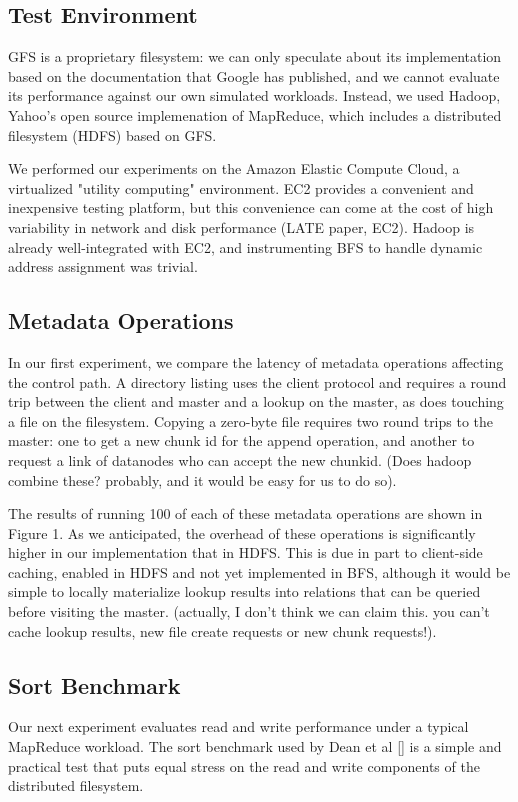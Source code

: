 \documentclass{article}
\begin{document}
\subsection{Test Environment}
GFS is a proprietary filesystem: we can only speculate about its implementation based on the documentation that Google has published, and we cannot evaluate its performance against our own simulated workloads.  Instead, we used Hadoop, Yahoo's open source implemenation of MapReduce, which includes a distributed filesystem (HDFS) based on GFS.

We performed our experiments on the Amazon Elastic Compute Cloud, a virtualized "utility computing" environment.  EC2 provides a convenient and inexpensive testing platform, but this convenience can come at the cost of high variability in network and disk performance (LATE paper, EC2).  Hadoop is already well-integrated with EC2, and instrumenting BFS to handle dynamic address assignment was trivial.

\subsection{Metadata Operations}
In our first experiment, we compare the latency of metadata operations affecting the control path.  A directory listing uses the client protocol and requires a round trip between the client and master and a lookup on the master, as does touching a file on the filesystem.  Copying a zero-byte file requires two round trips to the master: one to get a new chunk id for the append operation, and another to request a link of datanodes who can accept the new chunkid.  (Does hadoop combine these?  probably, and it would be easy for us to do so).

The results of running 100 of each of these metadata operations are shown in Figure 1.  As we anticipated, the overhead of these operations is significantly higher in our implementation that in HDFS.  This is due in part to client-side caching, enabled in HDFS and not yet implemented in BFS, although it would be simple to locally materialize lookup results into relations that can be queried before visiting the master. (actually, I don't think we can claim this.  you can't cache lookup results, new file create requests or new chunk requests!).

\subsection{Sort Benchmark}
Our next experiment evaluates read and write performance under a typical MapReduce workload.  The sort benchmark used by Dean et al [] is a simple and practical test that puts equal stress on the read and write components of the distributed filesystem.  
\end{document}
